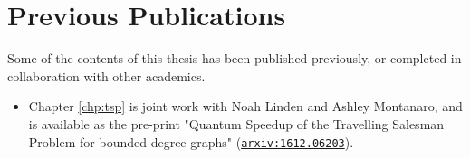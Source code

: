 \chapter*{Previous Publications}

Some of the contents of this thesis has been published previously, or completed in collaboration with other academics.

\begin{itemize}
\item Chapter \ref{chp:tsp} is joint work with Noah Linden and Ashley Montanaro, and is available as the pre-print "Quantum Speedup of the Travelling Salesman Problem for bounded-degree graphs" ({\tt \href{https://arxiv.org/abs/1612.06203}{arxiv:1612.06203}}).
\end{itemize}
